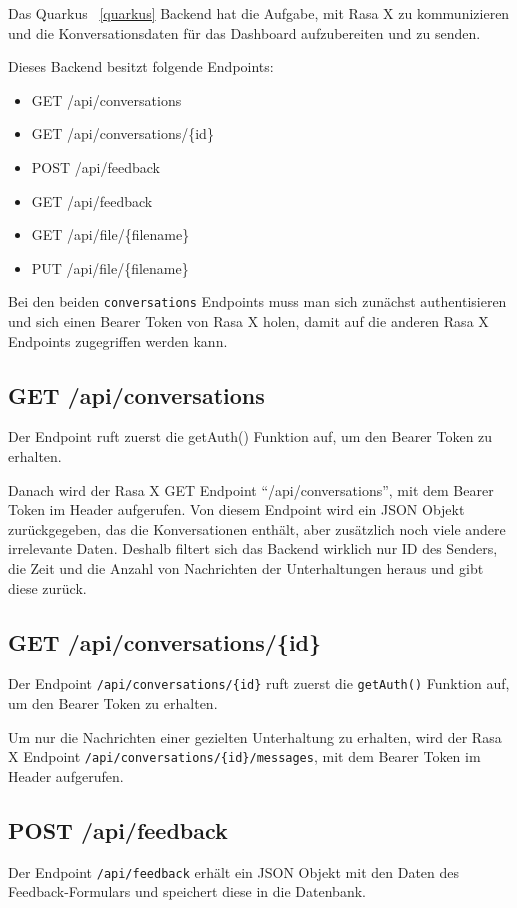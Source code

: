 Das Quarkus ~\ref{quarkus} Backend hat die Aufgabe, mit Rasa X zu kommunizieren und die Konversationsdaten für das Dashboard aufzubereiten und zu senden.

Dieses Backend besitzt folgende Endpoints:

\begin{itemize}
    \item GET /api/conversations
    \item GET /api/conversations/\{id\}
    \item POST /api/feedback
    \item GET /api/feedback
    \item GET /api/file/\{filename\}
    \item PUT /api/file/\{filename\}
\end{itemize}

Bei den beiden \texttt{conversations} Endpoints muss man sich zunächst authentisieren und sich einen Bearer Token von Rasa X holen, damit auf die anderen Rasa X Endpoints zugegriffen werden kann.

\subsection{GET /api/conversations}
Der Endpoint ruft zuerst die getAuth() Funktion auf, um den Bearer Token zu erhalten.

Danach wird der Rasa X GET Endpoint ``/api/conversations'', mit dem Bearer Token im Header aufgerufen.
Von diesem Endpoint wird ein JSON Objekt zurückgegeben, das die Konversationen enthält, aber zusätzlich noch viele andere irrelevante Daten.
Deshalb filtert sich das Backend wirklich nur ID des Senders, die Zeit und die Anzahl von Nachrichten der Unterhaltungen heraus und gibt diese zurück.

\subsection{GET /api/conversations/\{id\}}
Der Endpoint \texttt{/api/conversations/\{id\}} ruft zuerst die \texttt{getAuth()} Funktion auf, um den Bearer Token zu erhalten.

Um nur die Nachrichten einer gezielten Unterhaltung zu erhalten, wird der Rasa X Endpoint \texttt{/api/conversations/\{id\}/messages}, mit dem Bearer Token im Header aufgerufen.

\subsection{POST /api/feedback}
Der Endpoint \texttt{/api/feedback} erhält ein JSON Objekt mit den Daten des Feedback-Formulars und speichert diese in die Datenbank.

